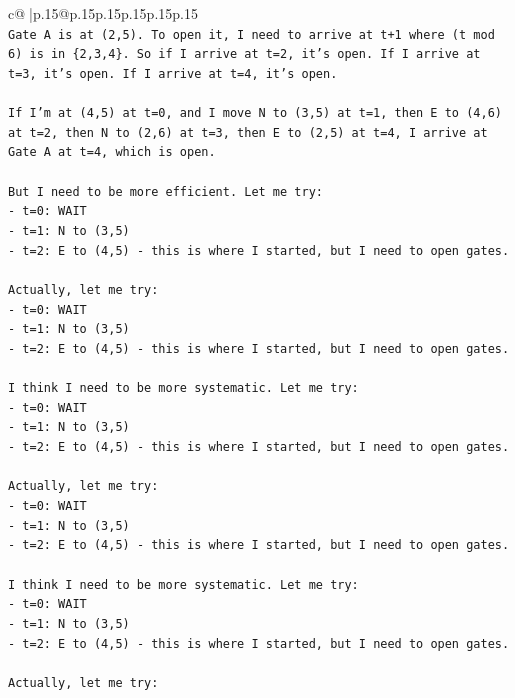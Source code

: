 \documentclass{article}
\begin{document}
{\begin{supertabular}{c@{$\;$}|p{.15\linewidth}@{}p{.15\linewidth}p{.15\linewidth}p{.15\linewidth}p{.15\linewidth}p{.15\linewidth}}
{{{\\ 
\texttt{Gate A is at (2,5). To open it, I need to arrive at t+1 where (t mod 6) is in \{2,3,4\}. So if I arrive at t=2, it's open. If I arrive at t=3, it's open. If I arrive at t=4, it's open.} \\
\\ 
\texttt{If I'm at (4,5) at t=0, and I move N to (3,5) at t=1, then E to (4,6) at t=2, then N to (2,6) at t=3, then E to (2,5) at t=4, I arrive at Gate A at t=4, which is open.} \\
\\ 
\texttt{But I need to be more efficient. Let me try:} \\
\texttt{{-} t=0: WAIT} \\
\texttt{{-} t=1: N to (3,5)} \\
\texttt{{-} t=2: E to (4,5) {-} this is where I started, but I need to open gates.} \\
\\ 
\texttt{Actually, let me try:} \\
\texttt{{-} t=0: WAIT} \\
\texttt{{-} t=1: N to (3,5)} \\
\texttt{{-} t=2: E to (4,5) {-} this is where I started, but I need to open gates.} \\
\\ 
\texttt{I think I need to be more systematic. Let me try:} \\
\texttt{{-} t=0: WAIT} \\
\texttt{{-} t=1: N to (3,5)} \\
\texttt{{-} t=2: E to (4,5) {-} this is where I started, but I need to open gates.} \\
\\ 
\texttt{Actually, let me try:} \\
\texttt{{-} t=0: WAIT} \\
\texttt{{-} t=1: N to (3,5)} \\
\texttt{{-} t=2: E to (4,5) {-} this is where I started, but I need to open gates.} \\
\\ 
\texttt{I think I need to be more systematic. Let me try:} \\
\texttt{{-} t=0: WAIT} \\
\texttt{{-} t=1: N to (3,5)} \\
\texttt{{-} t=2: E to (4,5) {-} this is where I started, but I need to open gates.} \\
\\ 
\texttt{Actually, let me try:} \\
}}}
\end{supertabular}}
\end{document}
